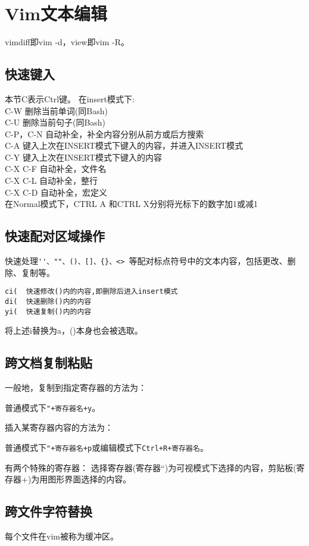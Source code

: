 \section{Vim文本编辑}

vimdiff即vim -d，view即vim -R。


\subsection{快速键入}
本节C表示Ctrl键。
在insert模式下:\\
C-W 删除当前单词(同Bash) \\
C-U 删除当前句子(同Bash)\\
C-P，C-N  自动补全，补全内容分别从前方或后方搜索\\
C-A 键入上次在INSERT模式下键入的内容，并进入INSERT模式\\
C-Y 键入上次在INSERT模式下键入的内容\\
C-X C-F 自动补全，文件名\\
C-X C-L 自动补全，整行\\
C-X C-D  自动补全，宏定义\\

在Normal模式下，CTRL A 和CTRL X分别将光标下的数字加1或减1

\subsection{快速配对区域操作}
快速处理\verb+''、""、()、[]、{}、<> +等配对标点符号中的文本内容，包括更改、删除、复制等。
\begin{verbatim}
ci(  快速修改()内的内容,即删除后进入insert模式
di(  快速删除()内的内容
yi(  快速复制()内的内容
\end{verbatim}
将上述i替换为a，()本身也会被选取。


\subsection{跨文档复制粘贴}
一般地，复制到指定寄存器的方法为：

普通模式下\verb|"+寄存器名+y|。

插入某寄存器内容的方法为：

普通模式下\verb|"+寄存器名+p|或编辑模式下\verb|Ctrl+R+寄存器名|。

有两个特殊的寄存器： 选择寄存器(寄存器``)为可视模式下选择的内容，剪贴板(寄存器+)为用图形界面选择的内容。


\subsection{跨文件字符替换}
每个文件在vim被称为缓冲区。

